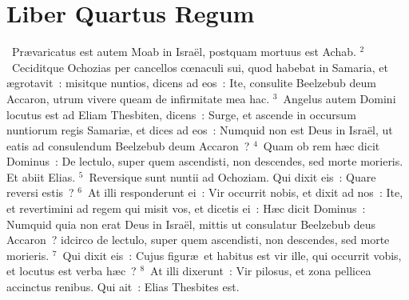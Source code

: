 \clearpage
{\centering \section*{Liber Quartus Regum}}\thispagestyle{empty}

~Pr\ae varicatus est autem Moab in Isra\"el, postquam mortuus est Achab.
${}^{2}$~Ceciditque Ochozias per cancellos cœnaculi sui, quod habebat in Samaria, et \ae grotavit~: misitque nuntios, dicens ad eos~: Ite, consulite Beelzebub deum Accaron, utrum vivere queam de infirmitate mea hac.
${}^{3}$~Angelus autem Domini locutus est ad Eliam Thesbiten, dicens~: Surge, et ascende in occursum nuntiorum regis Samari\ae , et dices ad eos~: Numquid non est Deus in Isra\"el, ut eatis ad consulendum Beelzebub deum Accaron~?
${}^{4}$~Quam ob rem h\ae c dicit Dominus~: De lectulo, super quem ascendisti, non descendes, sed morte morieris. Et abiit Elias.
${}^{5}$~Reversique sunt nuntii ad Ochoziam. Qui dixit eis~: Quare reversi estis~?
${}^{6}$~At illi responderunt ei~: Vir occurrit nobis, et dixit ad nos~: Ite, et revertimini ad regem qui misit vos, et dicetis ei~: H\ae c dicit Dominus~: Numquid quia non erat Deus in Isra\"el, mittis ut consulatur Beelzebub deus Accaron~? idcirco de lectulo, super quem ascendisti, non descendes, sed morte morieris.
${}^{7}$~Qui dixit eis~: Cujus figur\ae\ et habitus est vir ille, qui occurrit vobis, et locutus est verba h\ae c~?
${}^{8}$~At illi dixerunt~: Vir pilosus, et zona pellicea accinctus renibus. Qui ait~: Elias Thesbites est.


